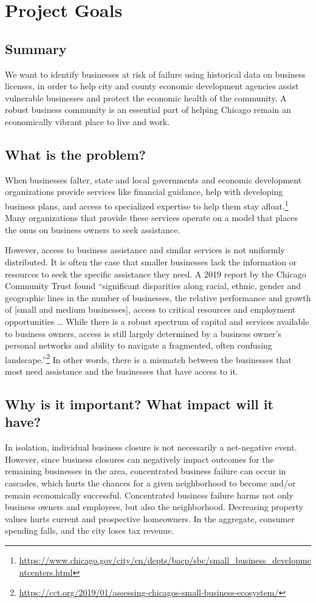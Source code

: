 \section{Project Goals}
\subsection{Summary}
We want to identify businesses at risk of failure using historical data on business licenses, in order to help city and county economic development agencies assist vulnerable businesses and protect the economic health of the community. A robust business community is an essential part of helping Chicago remain an economically vibrant place to live and work. 
\subsection{What is the problem?}
When businesses falter, state and local governments and economic development organizations provide services like financial guidance, help with developing business plans, and access to specialized expertise to help them stay afloat.\footnote{\url{https://www.chicago.gov/city/en/depts/bacp/sbc/small_business_developmentcenters.html}} Many organizations that provide these services operate on a model that places the onus on business owners to seek assistance. 

However, access to business assistance and similar services is not uniformly distributed. It is often the case that smaller businesses lack the information or resources to seek the specific assistance they need. A 2019 report by the Chicago Community Trust found “significant disparities along racial, ethnic, gender and geographic lines in the number of businesses, the relative performance and growth of [small and medium businesses], access to critical resources and employment opportunities … While there is a robust spectrum of capital and services available to business owners, access is still largely determined by a business owner's personal networks and ability to navigate a fragmented, often confusing landscape.”\footnote{\url{https://cct.org/2019/01/assessing-chicagos-small-business-ecosystem/}} In other words, there is a mismatch between the businesses that most need assistance and the businesses that have access to it.

\subsection{Why is it important? What impact will it have?}
In isolation, individual business closure is not necessarily a net-negative event. However, since business closures can negatively impact outcomes for the remaining businesses in the area, concentrated business failure can occur in cascades, which hurts the chances for a given neighborhood to become and/or remain economically successful. Concentrated business failure harms not only business owners and employees, but also the neighborhood. Decreasing property values hurts current and prospective homeowners. In the aggregate, consumer spending falls, and the city loses tax revenue. 

